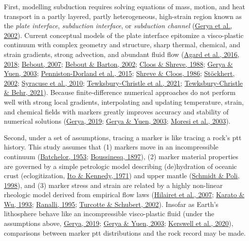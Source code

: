 First, modelling subduction requires solving equations of mass, motion, and heat transport in a partly layered, partly heterogeneous, high-strain region known as the \emph{plate interface}, \emph{subduction interface}, or \emph{subduction channel} (\protect\hyperlink{ref-gerya2002}{Gerya et al., 2002}). Current conceptual models of the plate interface epitomize a visco-plastic continuum with complex geometry and structure, sharp thermal, chemical, and strain gradients, strong advection, and abundant fluid flow (\protect\hyperlink{ref-agard2016}{Agard et al., 2016}, \protect\hyperlink{ref-agard2018}{2018}; \protect\hyperlink{ref-bebout2007}{Bebout, 2007}; \protect\hyperlink{ref-bebout2002}{Bebout \& Barton, 2002}; \protect\hyperlink{ref-cloos1988}{Cloos \& Shreve, 1988}; \protect\hyperlink{ref-gerya2003}{Gerya \& Yuen, 2003}; \protect\hyperlink{ref-penniston2015}{Penniston-Dorland et al., 2015}; \protect\hyperlink{ref-shreve1986}{Shreve \& Cloos, 1986}; \protect\hyperlink{ref-stockhert2002}{Stöckhert, 2002}; \protect\hyperlink{ref-syracuse2010}{Syracuse et al., 2010}; \protect\hyperlink{ref-tewksbury2021a}{Tewksbury-Christle et al., 2021}; \protect\hyperlink{ref-tewksbury2021b}{Tewksbury-Christle \& Behr, 2021}). Because finite-difference numerical approaches do not perform well with strong local gradients, interpolating and updating temperature, strain, and chemical fields with markers greatly improves accuracy and stability of numerical solutions (\protect\hyperlink{ref-gerya2019}{Gerya, 2019}; \protect\hyperlink{ref-gerya2003}{Gerya \& Yuen, 2003}; \protect\hyperlink{ref-moresi2003}{Moresi et al., 2003}).

Second, under a set of assumptions, tracing a marker is like tracing a rock's \gls{ptt} history. This study assumes that (1) markers move in an incompressible continuum (\protect\hyperlink{ref-batchelor1953}{Batchelor, 1953}; \protect\hyperlink{ref-boussinesq1897}{Boussinesq, 1897}), (2) marker material properties are governed by a simple petrologic model describing (de)hydration of oceanic crust (eclogitization, \protect\hyperlink{ref-ito1971}{Ito \& Kennedy, 1971}) and upper mantle (\protect\hyperlink{ref-schmidt1998}{Schmidt \& Poli, 1998}), and (3) marker stress and strain are related by a highly non-linear rheologic model derived from empirical flow laws (\protect\hyperlink{ref-hilairet2007}{Hilairet et al., 2007}; \protect\hyperlink{ref-karato1993}{Karato \& Wu, 1993}; \protect\hyperlink{ref-ranalli1995}{Ranalli, 1995}; \protect\hyperlink{ref-turcotte2002}{Turcotte \& Schubert, 2002}). Insofar as Earth's lithosphere behave like an incompressible visco-plastic fluid (under the assumptions above, \protect\hyperlink{ref-gerya2019}{Gerya, 2019}; \protect\hyperlink{ref-gerya2003}{Gerya \& Yuen, 2003}; \protect\hyperlink{ref-kerswell2020}{Kerswell et al., 2020}), comparisons between marker \gls{ptt} distributions and the rock record may be made.

